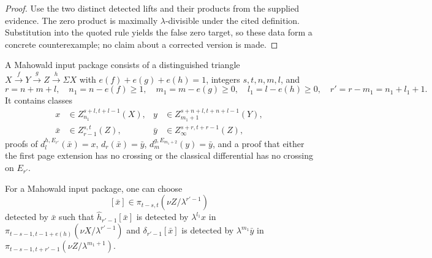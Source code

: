 \begin{proof}
  Use the two distinct detected lifts and their products from the supplied
  evidence.  The zero product is maximally $\lambda$-divisible under the cited
  definition.  Substitution into the quoted rule yields the false zero target,
  so these data form a concrete counterexample; no claim about a corrected
  version is made.
\end{proof}

\begin{definition}
  \label{def:mahowald-input-data}
  \notready
  A Mahowald input package consists of a distinguished triangle
  $X\xrightarrow fY\xrightarrow gZ\xrightarrow h\Sigma X$ with
  $e(f)+e(g)+e(h)=1$, integers $s,t,n,m,l$, and
  \[
    r=n+m+l,\quad n_1=n-e(f)\ge1,\quad
    m_1=m-e(g)\ge0,\quad l_1=l-e(h)\ge0,\quad
    r'=r-m_1=n_1+l_1+1.
  \]
  It contains classes
  \[
  \begin{aligned}
    x&\in Z_{n_1}^{s+l,t+l-1}(X),&
    y&\in Z_{m_1+1}^{s+n+l,t+n+l-1}(Y),\\
    \bar x&\in Z_{r-1}^{s,t}(Z),&
    \bar y&\in Z_\infty^{s+r,t+r-1}(Z),
  \end{aligned}
  \]
  proofs of $d_l^{h,E_{r'}}(\bar x)=x$, $d_r(\bar x)=\bar y$,
  $d_m^{g,E_{m_1+2}}(y)=\bar y$, and a proof that either the first page
  extension has no crossing or the classical differential has no crossing on
  $E_{r'}$.
\end{definition}

\begin{lemma}
  \label{lem:mahowald-synchronized-representatives}
  \notready
  For a Mahowald input package, one can choose
  \[
    [\bar x]\in\pi_{t-s,t}(\nu Z/\lambda^{r'-1})
  \]
  detected by $\bar x$ such that
  $\widehat h_{r'-1}[\bar x]$ is detected by
  $\lambda^{l_1}x$ in
  $\pi_{t-s-1,t-1+e(h)}(\nu X/\lambda^{r'-1})$ and
  $\delta_{r'-1}[\bar x]$ is detected by
  $\lambda^{m_1}\bar y$ in
  $\pi_{t-s-1,t+r'-1}(\nu Z/\lambda^{m_1+1})$.
\end{lemma}

